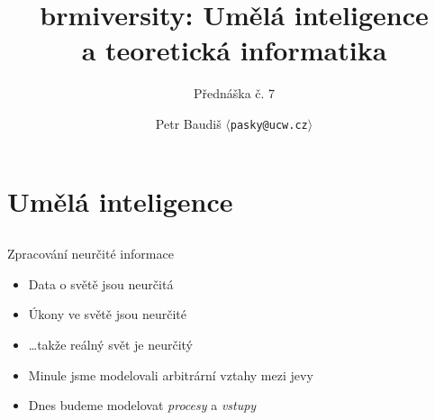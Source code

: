 \documentclass{beamer}
\begin{document}

\title{brmiversity: Umělá inteligence \\ a teoretická informatika}
\subtitle{Přednáška č. 7}
\author{Petr Baudiš $\langle${\tt pasky@ucw.cz}$\rangle$}
\date{}
\frame{\titlepage}

\section{Umělá inteligence}

\subsection{}
\begin{frame}{Zpracování neurčité informace}
\begin{itemize}
\item Data o světě jsou neurčitá
\item Úkony ve světě jsou neurčité
\item \dots takže reálný svět je neurčitý
\item Minule jsme modelovali arbitrární vztahy mezi jevy
\item Dnes budeme modelovat {\em procesy} a {\em vstupy}
\end{itemize}
\end{frame}
\end{document}
